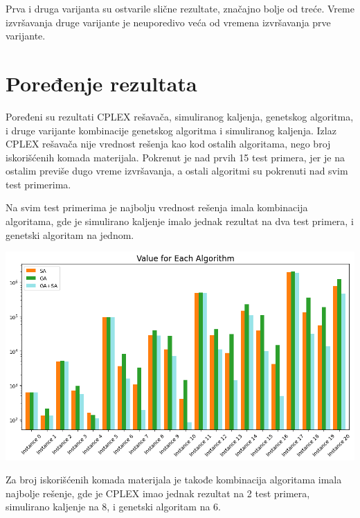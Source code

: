 \documentclass[12pt, a4paper]{article}
\begin{document}
Prva i druga varijanta su ostvarile slične rezultate, značajno bolje od treće. Vreme izvršavanja druge varijante je neuporedivo veća od vremena izvršavanja prve varijante.


\section{Poređenje rezultata}

Poređeni su rezultati CPLEX rešavača, simuliranog kaljenja, genetskog algoritma, i druge varijante kombinacije genetskog algoritma i simuliranog kaljenja. Izlaz CPLEX rešavača nije vrednost rešenja kao kod ostalih algoritama, nego broj iskorišćenih komada materijala. Pokrenut je nad prvih 15 test primera, jer je na ostalim previše dugo vreme izvršavanja, a ostali algoritmi su pokrenuti nad svim test primerima.

Na svim test primerima je najbolju vrednost rešenja imala kombinacija algoritama, gde je simulirano kaljenje imalo jednak rezultat na dva test primera, i genetski algoritam na jednom.

\vspace{0.5cm}
\begin{center}
  \hspace{1cm}
  \includegraphics[width=\linewidth]{img/comparison_value.png}
  \hspace{1cm} 
\end{center}
\vspace{0.5cm}

Za broj iskorišćenih komada materijala je takođe kombinacija algoritama imala najbolje rešenje, gde je CPLEX imao jednak rezultat na 2 test primera, simulirano kaljenje na 8, i genetski algoritam na 6.
\end{document}
